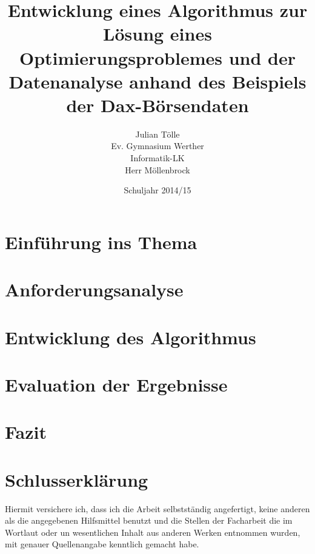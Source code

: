 \documentclass[12pt, a4paper, titlepage, draft]{report}
\begin{document}
    \title{Entwicklung eines Algorithmus zur Lösung eines Optimierungsproblemes und der Datenanalyse anhand des Beispiels der Dax-Börsendaten}
    \author{Julian Tölle\\
            Ev. Gymnasium Werther\\
            Informatik-LK\\
            Herr Möllenbrock}
    \date{Schuljahr 2014/15} 
    
    \maketitle

    \tableofcontents    

    \chapter{Einführung ins Thema}

    \chapter{Anforderungsanalyse}

    \chapter{Entwicklung des Algorithmus}

    \chapter{Evaluation der Ergebnisse}

    \chapter{Fazit}

    \chapter{Schlusserklärung}
    Hiermit versichere ich, dass ich die Arbeit selbstständig angefertigt, keine anderen als die angegebenen Hilfsmittel benutzt und die Stellen der Facharbeit die im Wortlaut oder un wesentlichen Inhalt aus anderen Werken entnommen wurden, mit genauer Quellenangabe kenntlich gemacht habe.
\end{document}
